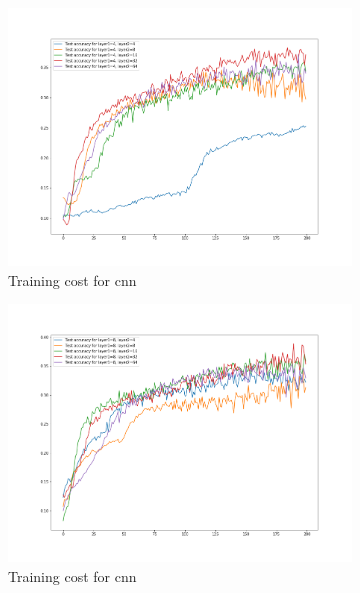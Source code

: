 \begin{figure}[H]
    \begin{subfigure}{0.5\textwidth}
        \centering
        \includegraphics[width=1\linewidth]{assets/plots1/q2_0.png}
        \caption{Training cost for cnn}
    \end{subfigure}
    \begin{subfigure}{0.5\textwidth}
        \centering
        \includegraphics[width=1\linewidth]{assets/plots1/q2_1.png}
        \caption{Training cost for cnn}
    \end{subfigure}
    \begin{subfigure}{0.5\textwidth}
        \centering

\end{subfigure}
\end{figure}
